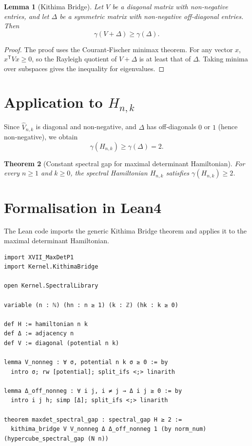 \documentclass[11pt,a4paper]{article}
\newtheorem{theorem}{Theorem}[section]
\newtheorem{lemma}[theorem]{Lemma}
\begin{document}
\begin{lemma}[Kithima Bridge]
Let $V$ be a diagonal matrix with non‑negative entries, and let $\Delta$ be a symmetric matrix with non‑negative off‑diagonal entries. Then
\[
\gamma(V + \Delta) \ge \gamma(\Delta).
\]
\end{lemma}
\begin{proof}
The proof uses the Courant‑Fischer minimax theorem. For any vector $x$, $x^{\mathsf T} V x \ge 0$, so the Rayleigh quotient of $V+\Delta$ is at least that of $\Delta$. Taking minima over subspaces gives the inequality for eigenvalues.
\end{proof}

\section{Application to $H_{n,k}$}

Since $\hat{V}_{n,k}$ is diagonal and non‑negative, and $\Delta$ has off‑diagonals $0$ or $1$ (hence non‑negative), we obtain
\[
\gamma(H_{n,k}) \ge \gamma(\Delta) = 2.
\]

\begin{theorem}[Constant spectral gap for maximal determinant Hamiltonian]
For every $n\ge 1$ and $k\ge 0$, the spectral Hamiltonian $H_{n,k}$ satisfies $\gamma(H_{n,k}) \ge 2$.
\end{theorem}

\section{Formalisation in Lean4}

The Lean code imports the generic Kithima Bridge theorem and applies it to the maximal determinant Hamiltonian.

\begin{lstlisting}[style=lean, caption={XVII_MaxDetP2.lean (excerpt)}]
import XVII_MaxDetP1
import Kernel.KithimaBridge

open Kernel.SpectralLibrary

variable (n : ℕ) (hn : n ≥ 1) (k : ℤ) (hk : k ≥ 0)

def H := hamiltonian n k
def Δ := adjacency n
def V := diagonal (potential n k)

lemma V_nonneg : ∀ σ, potential n k σ ≥ 0 := by
  intro σ; rw [potential]; split_ifs <;> linarith

lemma Δ_off_nonneg : ∀ i j, i ≠ j → Δ i j ≥ 0 := by
  intro i j h; simp [Δ]; split_ifs <;> linarith

theorem maxdet_spectral_gap : spectral_gap H ≥ 2 :=
  kithima_bridge V V_nonneg Δ Δ_off_nonneg 1 (by norm_num) (hypercube_spectral_gap (N n))
\end{lstlisting}
\end{document}

